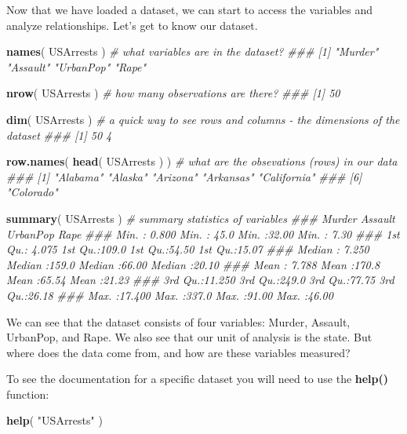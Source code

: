 \documentclass[]{book}
\newenvironment{Shaded}{\begin{snugshade}}{\end{snugshade}}
\newcommand{\CommentTok}[1]{\textcolor[rgb]{0.56,0.35,0.01}{\textit{#1}}}
\newcommand{\KeywordTok}[1]{\textcolor[rgb]{0.13,0.29,0.53}{\textbf{#1}}}
\newcommand{\NormalTok}[1]{#1}
\newcommand{\StringTok}[1]{\textcolor[rgb]{0.31,0.60,0.02}{#1}}
\theoremstyle{definition}
\theoremstyle{definition}
\theoremstyle{definition}
\theoremstyle{remark}
\begin{document}
Now that we have loaded a dataset, we can start to access the variables
and analyze relationships. Let's get to know our dataset.

\begin{Shaded}
\begin{Highlighting}[]

\KeywordTok{names}\NormalTok{( USArrests )  }\CommentTok{# what variables are in the dataset?}
\CommentTok{### [1] "Murder"   "Assault"  "UrbanPop" "Rape"}

\KeywordTok{nrow}\NormalTok{( USArrests )   }\CommentTok{# how many observations are there?}
\CommentTok{### [1] 50}

\KeywordTok{dim}\NormalTok{( USArrests )    }\CommentTok{# a quick way to see rows and columns - the dimensions of the dataset}
\CommentTok{### [1] 50  4}

\KeywordTok{row.names}\NormalTok{( }\KeywordTok{head}\NormalTok{( USArrests ) )   }\CommentTok{# what are the obsevations (rows) in our data}
\CommentTok{### [1] "Alabama"    "Alaska"     "Arizona"    "Arkansas"   "California"}
\CommentTok{### [6] "Colorado"}

\KeywordTok{summary}\NormalTok{( USArrests )   }\CommentTok{# summary statistics of variables}
\CommentTok{###      Murder          Assault         UrbanPop          Rape      }
\CommentTok{###  Min.   : 0.800   Min.   : 45.0   Min.   :32.00   Min.   : 7.30  }
\CommentTok{###  1st Qu.: 4.075   1st Qu.:109.0   1st Qu.:54.50   1st Qu.:15.07  }
\CommentTok{###  Median : 7.250   Median :159.0   Median :66.00   Median :20.10  }
\CommentTok{###  Mean   : 7.788   Mean   :170.8   Mean   :65.54   Mean   :21.23  }
\CommentTok{###  3rd Qu.:11.250   3rd Qu.:249.0   3rd Qu.:77.75   3rd Qu.:26.18  }
\CommentTok{###  Max.   :17.400   Max.   :337.0   Max.   :91.00   Max.   :46.00}
\end{Highlighting}
\end{Shaded}

We can see that the dataset consists of four variables: Murder, Assault,
UrbanPop, and Rape. We also see that our unit of analysis is the state.
But where does the data come from, and how are these variables measured?

To see the documentation for a specific dataset you will need to use the
\textbf{help()} function:

\begin{Shaded}
\begin{Highlighting}[]
\KeywordTok{help}\NormalTok{( }\StringTok{"USArrests"}\NormalTok{ )}
\end{Highlighting}
\end{Shaded}
\end{document}
